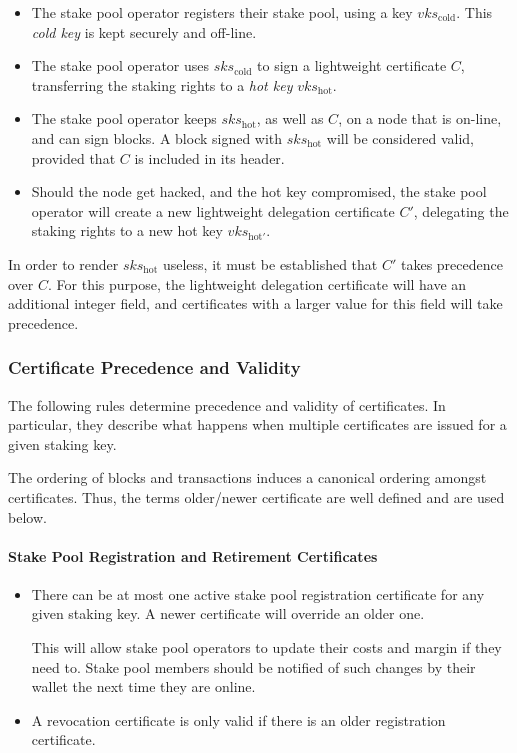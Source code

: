 \documentclass[11pt,a4paper]{article}
\begin{document}
\begin{itemize}
\item
  The stake pool operator registers their stake pool, using a key
  \(vks_\text{cold}\). This \emph{cold key} is kept securely and
  off-line.
\item
  The stake pool operator uses \(sks_\text{cold}\) to sign a lightweight
  certificate \(C\), transferring the staking rights to a \emph{hot key}
  \(vks_\text{hot}\).
\item
  The stake pool operator keeps \(sks_\text{hot}\), as well as \(C\), on
  a node that is on-line, and can sign blocks. A block signed with
  \(sks_\text{hot}\) will be considered valid, provided that \(C\) is
  included in its header.
\item
  Should the node get hacked, and the hot key compromised, the stake
  pool operator will create a new lightweight delegation certificate
  \(C'\), delegating the staking rights to a new hot key
  \(vks_{\text{hot}'}\).
\end{itemize}

In order to render \(sks_\text{hot}\) useless, it must be established
that \(C'\) takes precedence over \(C\). For this purpose, the
lightweight delegation certificate will have an additional integer
field, and certificates with a larger value for this field will take
precedence.

\subsubsection{Certificate Precedence and
Validity}\label{certificate-precedence-and-validity}

The following rules determine precedence and validity of certificates.
In particular, they describe what happens when multiple certificates are
issued for a given staking key.

The ordering of blocks and transactions induces a canonical ordering
amongst certificates. Thus, the terms older/newer certificate are well
defined and are used below.

\paragraph{Stake Pool Registration and Retirement
Certificates}\label{stake-pool-registration-and-retirement-certificates}

\begin{itemize}
\item
  There can be at most one active stake pool registration certificate
  for any given staking key. A newer certificate will override an older
  one.

  This will allow stake pool operators to update their costs and margin
  if they need to. Stake pool members should be notified of such changes
  by their wallet the next time they are online.
\item
  A revocation certificate is only valid if there is an older
  registration certificate.
\end{itemize}
\end{document}
